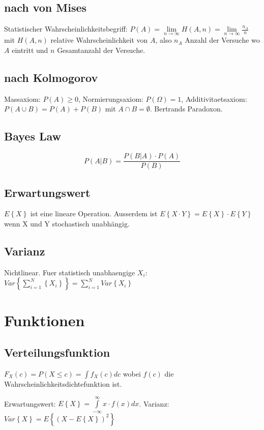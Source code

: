 \documentclass[10pt,a4paper]{article}
\begin{document}
\subsection{nach von Mises}
Statistischer Wahrscheinlichkeitsbegriff: $P(A)=\lim\limits_{n \rightarrow \infty} H(A,n)=\lim\limits_{n \rightarrow \infty} \frac{n_A}{n}$ mit $H(A,n)$ relative Wahrscheinlichkeit von $A$, also $n_A$ Anzahl der Versuche wo $A$ eintritt und $n$ Gesamtanzahl der Versuche.
\subsection{nach Kolmogorov}
Massaxiom: $P(A) \geq 0$, Normierungsaxiom: $P(\Omega)=1$, Additivitaetsaxiom: $P(A \cup B) = P(A) + P(B)$ mit $A \cap B = \emptyset$. Bertrands Paradoxon.

\subsection{Bayes Law}
\[P(A|B)= \frac{P(B|A) \cdot P(A)}{P(B)}\]

\subsection{Erwartungswert}
$E\left\{X\right\}$ ist eine lineare Operation. Ausserdem ist $E\left\{X\cdot Y\right\} = E\left\{X\right\} \cdot E\left\{Y\right\}$ wenn X und Y stochastisch unabhängig.

\subsection{Varianz}
Nichtlinear. Fuer statistisch unabhaengige $X_i$: $Var\left\{ \sum\limits_{i=1}^N \left\{X_i\right\}\right\} = \sum\limits_{i=1}^N Var\left\{X_i\right\}$

\section{Funktionen}
\subsection{Verteilungsfunktion}
$F_X(c) = P(X \leq c) = \int f_X(c) dc$ wobei $f(c)$ die Wahrscheinlichkeitsdichtefunktion ist.

Erwartungswert: $E\left\{ X \right\} = \int\limits_{-\infty}^\infty x\cdot f(x) dx$. Varianz: $Var\left\{ X \right\} = E\left\{ (X-E\left\{ X \right\})^2 \right\}$
\end{document}
